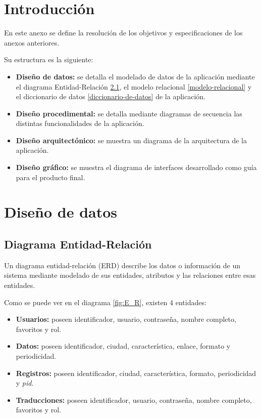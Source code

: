 
\section{Introducción}
En este anexo se define la resolución de los objetivos y especificaciones de los anexos anteriores.

Su estructura es la siguiente:
\begin{itemize}
    \item \textbf{Diseño de datos:} se detalla el modelado de datos de la aplicación mediante el diagrama Entidad-Relación \ref{e-r}, el modelo relacional \ref{modelo-relacional} y el diccionario de datos \ref{diccionario-de-datos} de la aplicación.
    \item \textbf{Diseño procedimental:} se detalla mediante diagramas de secuencia las distintas funcionalidades de la aplicación.
    \item \textbf{Diseño arquitectónico:} se muestra un diagrama de la arquitectura de la aplicación.
    \item \textbf{Diseño gráfico:} se muestra el diagrama de interfaces desarrollado como guía para el producto final.
\end{itemize}

\section{Diseño de datos}
\subsection{Diagrama Entidad-Relación}\label{e-r}

Un diagrama entidad-relación (ERD) describe los datos o información de un sistema mediante modelado de sus entidades, atributos y las relaciones entre esas entidades. \cite{Chen1976}

Como se puede ver en el diagrama \ref{fig:E_R}, existen 4 entidades:
\begin{itemize}
    \item \textbf{Usuarios:} poseen identificador, usuario, contraseña, nombre completo, favoritos y rol.
    \item \textbf{Datos:} poseen identificador, ciudad, característica, enlace, formato y periodicidad.
    \item \textbf{Registros:} poseen identificador, ciudad, característica, formato, periodicidad y \textit{pid}.
    \item \textbf{Traducciones:} poseen identificador, usuario, contraseña, nombre completo, favoritos y rol.
\end{itemize}

